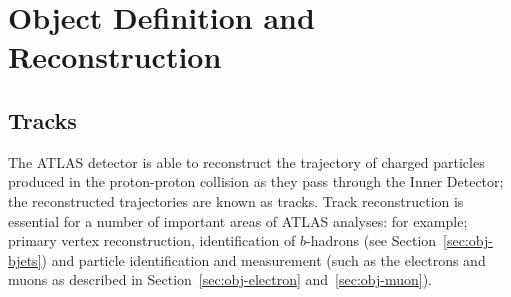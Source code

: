 \chapter{Object Definition and Reconstruction}
\label{sec:obj}

\section{Tracks}
\label{sec:obj-tracks}

The ATLAS detector is able to reconstruct the trajectory of charged particles produced
in the proton-proton collision as they pass through the Inner Detector;
the reconstructed trajectories are known as tracks.
Track reconstruction is essential for a number of important areas of ATLAS analyses:
for example; primary vertex reconstruction, identification of $b$-hadrons (see Section~\ref{sec:obj-bjets})
and particle identification and measurement (such as the electrons and muons as described in Section~\ref{sec:obj-electron} and~\ref{sec:obj-muon}).

